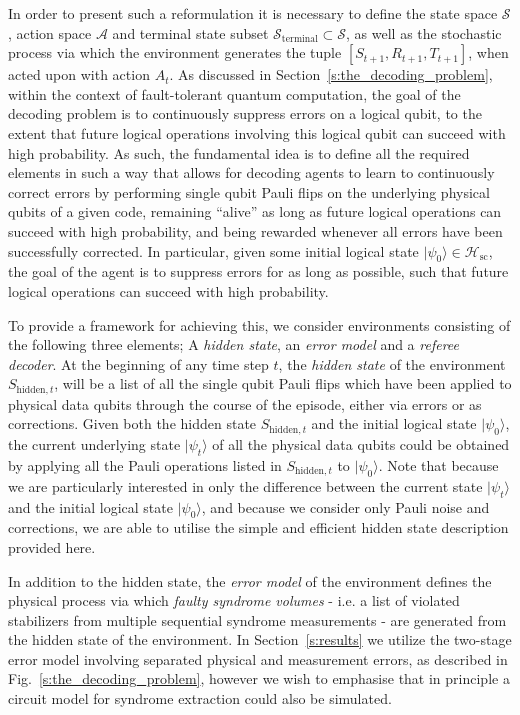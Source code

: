 \documentclass[twocolumn,preprintnumbers,amsmath,amssymb,notitlepage,nofootinbib,longbibliography,superscriptaddress,aps,pra,10pt]{revtex4-1}
\begin{document}
	In order to present such a reformulation it is necessary to define the state space $\mathcal{S}$, action space $\mathcal{A}$ and terminal state subset $\mathcal{S}_\mathrm{terminal} \subset \mathcal{S}$, as well as the stochastic process via which the environment generates the tuple $[S_{t+1},R_{t+1},T_{t+1}]$,  when acted upon with action $A_t$.
	As discussed in Section~\ref{s:the_decoding_problem}, within the context of fault-tolerant quantum computation, the goal of the decoding problem is to continuously suppress errors on a logical qubit, to the extent that future logical operations involving this logical qubit can succeed with high probability.
	As such, the fundamental idea is to define all the required elements in such a way that allows for decoding agents to learn to continuously correct errors by performing single qubit Pauli flips on the underlying physical qubits of a given code, remaining ``alive'' as long as future logical operations can succeed with high probability, and being rewarded whenever all errors have been successfully corrected.
	In particular, given some initial logical state $|\psi_0\rangle \in \mathcal{H}_{\mathrm{sc}}$, the goal of the agent is to suppress errors for as long as possible, such that future logical operations can succeed with high probability.

	To provide a framework for achieving this, we consider environments consisting of the following three elements; A \emph{hidden state}, an \emph{error model} and a \emph{referee decoder}.
	At the beginning of any time step $t$, the \emph{hidden state} of the environment $S_{\mathrm{hidden},t}$, will be a list of all the single qubit Pauli flips which have been applied to physical data qubits through the course of the episode, either via errors or as corrections.
	Given both the hidden state $S_{\mathrm{hidden},t}$ and the initial logical state $|\psi_0\rangle$, the current underlying state $|\psi_t\rangle$ of all the physical data qubits could be obtained by applying all the Pauli operations listed in $S_{\mathrm{hidden},t}$ to $|\psi_0\rangle$.
	Note that because we are particularly interested in only the difference between the current state $|\psi_t\rangle$ and the initial logical state $|\psi_0\rangle$, and because we consider only Pauli noise and corrections, we are able to utilise the simple and efficient hidden state description provided here.

	In addition to the hidden state, the \emph{error model} of the environment defines the physical process via which \emph{faulty syndrome volumes} - i.e. a list of violated stabilizers from multiple sequential syndrome measurements - are generated from the hidden state of the environment.
	In Section~\ref{s:results} we utilize the two-stage error model involving separated physical and measurement errors, as described in Fig.~\ref{s:the_decoding_problem}, however we wish to emphasise that in principle a circuit model for syndrome extraction could also be simulated.
\end{document}
